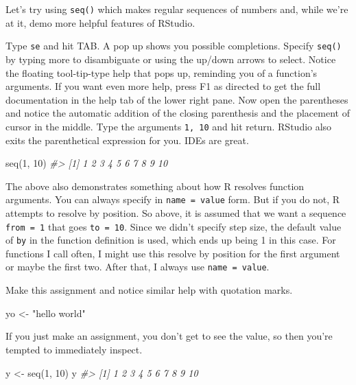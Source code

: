 \documentclass[
]{book}
\newenvironment{Shaded}{\begin{snugshade}}{\end{snugshade}}
\newcommand{\CommentTok}[1]{\textcolor[rgb]{0.56,0.35,0.01}{\textit{#1}}}
\newcommand{\DecValTok}[1]{\textcolor[rgb]{0.00,0.00,0.81}{#1}}
\newcommand{\FunctionTok}[1]{\textcolor[rgb]{0.00,0.00,0.00}{#1}}
\newcommand{\NormalTok}[1]{#1}
\newcommand{\OtherTok}[1]{\textcolor[rgb]{0.56,0.35,0.01}{#1}}
\newcommand{\StringTok}[1]{\textcolor[rgb]{0.31,0.60,0.02}{#1}}
\begin{document}
Let's try using \texttt{seq()} which makes regular sequences of numbers and, while we're at it, demo more helpful features of RStudio.

Type \texttt{se} and hit TAB. A pop up shows you possible completions. Specify \texttt{seq()} by typing more to disambiguate or using the up/down arrows to select. Notice the floating tool-tip-type help that pops up, reminding you of a function's arguments. If you want even more help, press F1 as directed to get the full documentation in the help tab of the lower right pane. Now open the parentheses and notice the automatic addition of the closing parenthesis and the placement of cursor in the middle. Type the arguments \texttt{1,\ 10} and hit return. RStudio also exits the parenthetical expression for you. IDEs are great.

\begin{Shaded}
\begin{Highlighting}[]
\FunctionTok{seq}\NormalTok{(}\DecValTok{1}\NormalTok{, }\DecValTok{10}\NormalTok{)}
\CommentTok{\#\textgreater{}  [1]  1  2  3  4  5  6  7  8  9 10}
\end{Highlighting}
\end{Shaded}

The above also demonstrates something about how R resolves function arguments. You can always specify in \texttt{name\ =\ value} form. But if you do not, R attempts to resolve by position. So above, it is assumed that we want a sequence \texttt{from\ =\ 1} that goes \texttt{to\ =\ 10}. Since we didn't specify step size, the default value of \texttt{by} in the function definition is used, which ends up being 1 in this case. For functions I call often, I might use this resolve by position for the first
argument or maybe the first two. After that, I always use \texttt{name\ =\ value}.

Make this assignment and notice similar help with quotation marks.

\begin{Shaded}
\begin{Highlighting}[]
\NormalTok{yo }\OtherTok{\textless{}{-}} \StringTok{"hello world"}
\end{Highlighting}
\end{Shaded}

If you just make an assignment, you don't get to see the value, so then you're tempted to immediately inspect.

\begin{Shaded}
\begin{Highlighting}[]
\NormalTok{y }\OtherTok{\textless{}{-}} \FunctionTok{seq}\NormalTok{(}\DecValTok{1}\NormalTok{, }\DecValTok{10}\NormalTok{)}
\NormalTok{y}
\CommentTok{\#\textgreater{}  [1]  1  2  3  4  5  6  7  8  9 10}
\end{Highlighting}
\end{Shaded}
\end{document}

